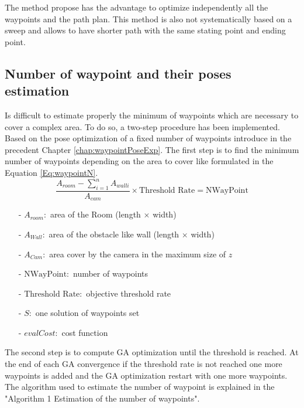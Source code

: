 The method propose has the advantage to optimize independently all the waypoints and the path plan. This method is also not systematically based on a sweep and allows to have shorter path with the same stating point and ending point. 


\subsection{Number of waypoint and their poses estimation}\label{sec:NmbWaypoint}

Is difficult to estimate properly the minimum of waypoints which are necessary to cover a complex area.
To do so, a two-step procedure has been implemented. Based on the pose optimization of a fixed number of waypoints introduce in the precedent Chapter \ref{chap:waypointPoseExp}. 
The first step is to find the minimum number of waypoints depending on the area to cover like formulated in the
 Equation \ref{Eq:waypointN}. \\
\begin{equation}\label{Eq:waypointN}
\frac{ A_{room} - \sum_{i=1}^n A_{wall i} }{A_{cam}} \times \mbox{Threshold Rate} = \mbox{NWayPoint}
\end{equation}

\begin{itemize}
\item[-] $ A_{room}: $  area of the Room (length $\times$ width)
\item[-] $ A_{Wall}: $  area of the obstacle like wall (length $\times$ width)
\item[-] $ A_{Cam}: $   area cover by the camera in the maximum size of $z$
\item[-] $ \mbox{NWayPoint}: $  number of waypoints
\item[-] $ \mbox{Threshold Rate}: $ objective threshold rate 
\item[-] $S:$ one solution of waypoints set 
\item[-] $evalCost:$ cost function  
\end{itemize}

The second step is to compute GA optimization until the threshold is reached. At the end of each GA convergence if the threshold rate is not reached one more waypoints is added and the GA optimization restart with one more waypoints. The algorithm  used to estimate the number of waypoint  is explained in the "Algorithm 1 Estimation of the number of waypoints".  

